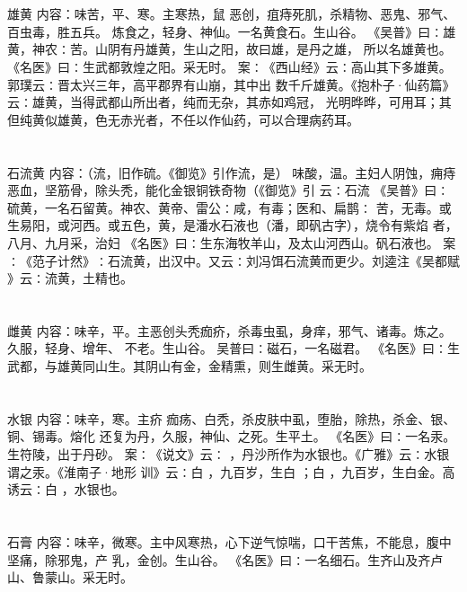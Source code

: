 \documentclass[12pt,UTF8]{ctexbook}
\begin{document}
\section{}雄黄
内容：味苦，平、寒。主寒热，鼠 恶创，疽痔死肌，杀精物、恶鬼、邪气、百虫毒，胜五兵。 
炼食之，轻身、神仙。一名黄食石。生山谷。 
《吴普》曰∶雄黄，神农∶苦。山阴有丹雄黄，生山之阳，故曰雄，是丹之雄， 
所以名雄黄也。 
《名医》曰∶生武都敦煌之阳。采无时。 
案∶《西山经》云∶高山其下多雄黄。郭璞云∶晋太兴三年，高平郡界有山崩，其中出 
数千斤雄黄。《抱朴子·仙药篇》云∶雄黄，当得武都山所出者，纯而无杂，其赤如鸡冠， 
光明晔晔，可用耳；其但纯黄似雄黄，色无赤光者，不任以作仙药，可以合理病药耳。 


\section{}石流黄
内容：（流，旧作硫。《御览》引作流，是） 
味酸，温。主妇人阴蚀，痈痔恶血，坚筋骨，除头秃，能化金银铜铁奇物（《御览》引 
云∶石流 
《吴普》曰∶硫黄，一名石留黄。神农、黄帝、雷公∶咸，有毒；医和、扁鹊∶ 
苦，无毒。或生易阳，或河西。或五色，黄，是潘水石液也（潘，即矾古字），烧令有紫焰 
者， 
八月、九月采，治妇 
《名医》曰∶生东海牧羊山，及太山河西山。矾石液也。 
案∶《范子计然》∶石流黄，出汉中。又云∶刘冯饵石流黄而更少。刘逵注《吴都赋 
》云∶流黄，土精也。 


\section{}雌黄
内容：味辛，平。主恶创头秃痂疥，杀毒虫虱，身痒，邪气、诸毒。炼之。久服，轻身、增年、 
不老。生山谷。 
吴普曰∶磁石，一名磁君。 
《名医》曰∶生武都，与雄黄同山生。其阴山有金，金精熏，则生雌黄。采无时。 


\section{}水银
内容：味辛，寒。主疥 痂疡、白秃，杀皮肤中虱，堕胎，除热，杀金、银、铜、锡毒。熔化 
还复为丹，久服，神仙、之死。生平土。 
《名医》曰∶一名汞。生符陵，出于丹砂。 
案∶《说文》云∶ ，丹沙所作为水银也。《广雅》云∶水银谓之汞。《淮南子·地形 
训》云∶白 ，九百岁，生白 ；白 ，九百岁，生白金。高诱云∶白 ，水银也。 


\section{}石膏
内容：味辛，微寒。主中风寒热，心下逆气惊喘，口干苦焦，不能息，腹中坚痛，除邪鬼，产 
乳，金创。生山谷。 
《名医》曰∶一名细石。生齐山及齐卢山、鲁蒙山。采无时。 
\end{document}
